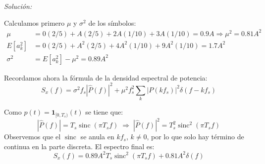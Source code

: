 \documentclass[a4paper,11pt]{article}
\DeclareMathOperator{\sinc}{sinc}
\newenvironment{solucion}[1][]{
\noindent \large \textsl{Solución:} \ifthenelse{\equal{#1}{}}{}{\emph{(#1)}}

\smallskip
}{
\bigskip
}
\begin{document}
\begin{solucion}

Calculamos primero $\mu$ y $\sigma^2$ de los símbolos:
\begin{align*}
        \mu &= 0 (2/5) + A (2/5) + 2A (1/10) + 3A (1/10) = 0.9 A \Rightarrow \mu^2 = 0.81 A^2\\
        E[a_k^2] &= 0 (2/5) + A^2 (2/5) + 4A^2 (1/10) + 9A^2 (1/10) = 1.7 A^2\\
        \sigma^2 &= E[a_k^2] - \mu^2 = 0.89 A^2
\end{align*}

Recordamos ahora la fórmula de la densidad espectral de potencia:
\begin{equation*}
        S_x(f) = \sigma^2 f_s |\hat{P}(f)|^2 + \mu^2 f_s^2 \sum_k |P(kf_s)|^2 \delta(f-k f_s)
\end{equation*}

Como $p(t) = \mathbf{1}_{[0,T_s)}(t)$ se tiene que:
\begin{equation*}
        |\hat{P}(f)| = T_s \sinc (\pi T_s f) \; \Rightarrow \; |\hat{P}(f)|^2 = T_s^2 \sinc^2 (\pi T_s f)
\end{equation*}
Observemos que el $\sinc$ se anula en $k f_s$, $k\neq 0$, por lo que solo hay término de continua en la parte discreta. El espectro final es:
\begin{equation*}
        S_x(f) = 0.89 A^2 T_s \sinc^2(\pi T_s f) + 0.81 A^2 \delta(f)
\end{equation*}
\begin{center}
\end{center}

\end{solucion}
\end{document}
